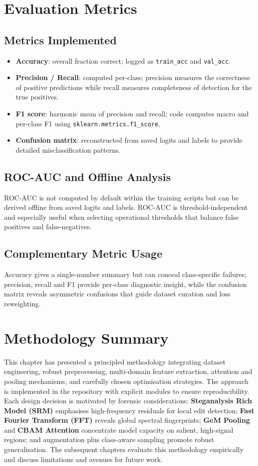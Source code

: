 \documentclass[11pt]{report}
\begin{document}
\section{Evaluation Metrics}
\subsection{Metrics Implemented}
\begin{itemize}
  \item \textbf{Accuracy}: overall fraction correct; logged as
  \texttt{train_acc} and \texttt{val_acc}.
  \item \textbf{Precision / Recall}: computed per-class; precision measures the
  correctness of positive predictions while recall measures completeness of
  detection for the true positives.
  \item \textbf{F1 score}: harmonic mean of precision and recall; code computes
  macro and per-class F1 using \texttt{sklearn.metrics.f1_score}.
  \item \textbf{Confusion matrix}: reconstructed from saved logits and labels to
  provide detailed misclassification patterns.
\end{itemize}

\subsection{ROC-AUC and Offline Analysis}
ROC-AUC is not computed by default within the training scripts but can be
derived offline from saved logits and labels. ROC-AUC is threshold-independent
and especially useful when selecting operational thresholds that balance false
positives and false-negatives.

\subsection{Complementary Metric Usage}
Accuracy gives a single-number summary but can conceal class-specific failures;
precision, recall and F1 provide per-class diagnostic insight, while the
confusion matrix reveals asymmetric confusions that guide dataset curation and
loss reweighting.

\section{Methodology Summary}
This chapter has presented a principled methodology integrating dataset
engineering, robust preprocessing, multi-domain feature extraction, attention
and pooling mechanisms, and carefully chosen optimisation strategies. The
approach is implemented in the repository with explicit modules to ensure
reproducibility. Each design decision is motivated by forensic considerations:
\textbf{Steganalysis Rich Model (SRM)} emphasises high-frequency residuals for
local edit detection; \textbf{Fast Fourier Transform (FFT)} reveals global
spectral fingerprints; \textbf{GeM Pooling} and \textbf{CBAM Attention}
concentrate model capacity on salient, high-signal regions; and augmentation
plus class-aware sampling promote robust generalisation. The subsequent
chapters evaluate this methodology empirically and discuss limitations and
avenues for future work.
\end{document}

